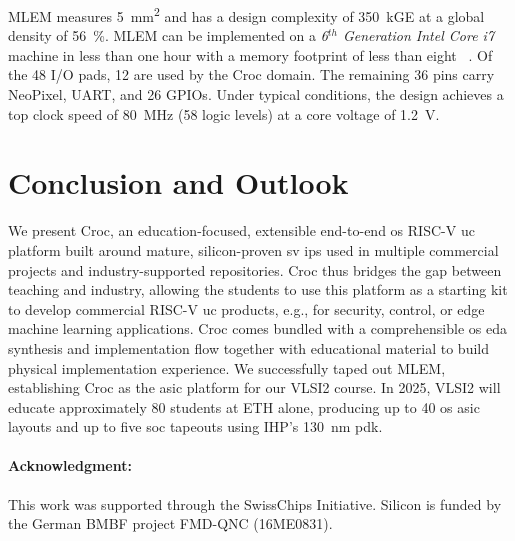 \documentclass[a4paper, 10pt, unnumberedsections, twoside]{LTJournalArticle}
\newcommand{\riscv}{\mbox{RISC-V}}
\begin{document}
%
MLEM measures \SI{5}{\milli\metre\squared} and has a design complexity of \SI{350}{kGE} at a global density of \SI{56}{\percent}.
MLEM can be implemented on a \emph{6$^{th}$ Generation Intel Core {i7}} machine in less than one hour with a memory footprint of less than eight \si{\gibi\byte}.
Of the 48 I/O pads, 12 are used by the Croc domain. 
The remaining 36 pins carry NeoPixel, UART, and 26 GPIOs.
%
Under typical conditions, the design achieves a top clock speed of \SI{80}{\mega\hertz} (58 logic levels) at a core voltage of \SI{1.2}{\volt}.
%


\section{Conclusion and Outlook}

We present Croc, an education-focused, extensible end-to-end \gls{os} {\riscv} \gls{uc} platform built around mature, silicon-proven \gls{sv} \glspl{ip} used in multiple commercial projects and industry-supported repositories.
Croc thus bridges the gap between teaching and industry, allowing the students to use this platform as a starting kit to develop commercial {\riscv} \gls{uc} products, e.g., for security, control, or edge machine learning applications.
%
Croc comes bundled with a comprehensible \gls{os} \gls{eda} synthesis and implementation flow together with educational material to build physical implementation experience.
%
We successfully taped out MLEM, establishing Croc as the \gls{asic} platform for our VLSI2 course.
%
In 2025, VLSI2 will educate approximately 80 students at ETH alone, producing up to 40 \gls{os} \gls{asic} layouts and up to five \gls{soc} tapeouts using IHP's \SI{130}{\nano\metre} \gls{pdk}.


\vspace{-0.2cm}
\noindent\paragraph{\textbf{Acknowledgment}:} %
This work was supported through the SwissChips Initiative.
%
Silicon is funded by the German BMBF project FMD-QNC (16ME0831).


\printbibliography
\end{document}
